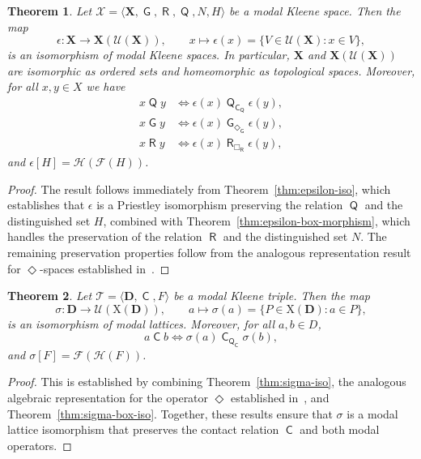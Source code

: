 \documentclass[10pt,a4paper]{amsart}
\newtheorem{theorem}{Theorem}[section]
\DeclareMathOperator{\con}{\mathsf{C}}
\DeclareMathOperator{\Q}{\mathsf{Q}}
\DeclareMathOperator{\G}{\mathsf{G}}
\DeclareMathOperator{\R}{\mathsf{R}}
\newcommand{\D}{\mathbf{D}}
\newcommand{\X}{\mathbf{X}}
\newcommand{\T}{\mathcal{T}}
\newcommand{\U}{\mathcal{U}}
\begin{document}
\begin{theorem}
\label{thm:epsilon-mdkt-morphism}
Let $\mathcal{X} = \langle \X, \G, \R, \Q,N, H \rangle$ be a modal Kleene space. Then the map
\[
\epsilon \colon \X \longrightarrow \X(\U(\X)), \qquad x \mapsto \epsilon(x) = \{V \in \U(\X) : x \in V\},
\]
is an isomorphism of modal Kleene spaces. In particular, $\X$ and $\X(\U(\X))$ are isomorphic as ordered sets and homeomorphic as topological spaces. Moreover, for all $x, y \in X$ we have
\begin{align*}
x \Q y &\iff \epsilon(x)\Q_{\con_{\Q}} \epsilon(y),\\
x\G y &\iff  \epsilon(x)\G_{\Diamond_{\G}} \epsilon(y),\\
x\R y &\iff \epsilon(x)\R_{\Box_{\R}} \epsilon(y),
\end{align*}
and $\epsilon[H] = \mathcal{H}(\mathcal{F}(H))$.
\end{theorem}
\begin{proof}
The result follows immediately from Theorem~\ref{thm:epsilon-iso}, which establishes that $\epsilon$ is a Priestley isomorphism preserving the relation $\Q$ and the distinguished set $H$, combined with Theorem~\ref{thm:epsilon-box-morphism}, which handles the preservation of the relation $\R$ and the distinguished set $N$. The remaining preservation properties follow from the analogous representation result for $\Diamond$-spaces established in~\cite{petrovich1996}.
\end{proof}

\begin{theorem}
\label{thm:sigma-mdkt-iso}
Let $\T = \langle \D, \con, F \rangle$ be a modal Kleene triple. Then the map
\[
\sigma \colon \D \longrightarrow \U(\mathrm{X}(\D)), \qquad a \mapsto \sigma(a) = \{P \in \mathrm{X}(\D) : a \in P\},
\]
is an isomorphism of modal lattices. Moreover, for all $a, b \in D$,
\[
a \con b \iff \sigma(a) \con_{\Q_{\con}} \sigma(b),
\]
and $\sigma[F] = \mathcal{F}(\mathcal{H}(F))$.
\end{theorem}
\begin{proof}
This is established by combining Theorem~\ref{thm:sigma-iso}, the analogous algebraic representation for the operator $\Diamond$ established in~\cite{petrovich1996}, and Theorem~\ref{thm:sigma-box-iso}. Together, these results ensure that $\sigma$ is a modal lattice isomorphism that preserves the contact relation $\con$ and both modal operators.
\end{proof}
\end{document}
